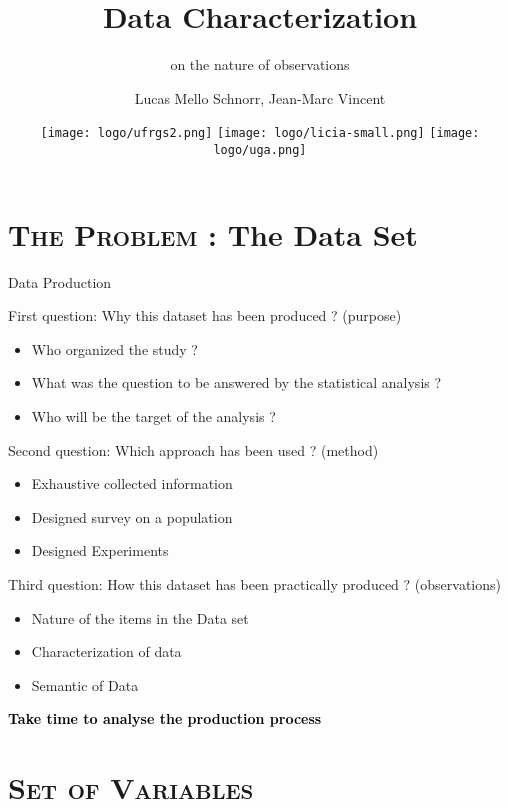 \documentclass[xcolor=x11names,compress,8pt,
handout
]{beamer}
\title[Data Characterization] %
{Data Characterization}
\subtitle{on the nature of observations}
\author%
{		
Lucas Mello Schnorr, Jean-Marc Vincent
}
\institute[LICIA] %
{%
{\large INF/UFRGS\\
Porto Alegre, Brazil – October 21th, 2017}
}
\date[Porto Alegre 2017] %
{
\texttt{[image: logo/ufrgs2.png]}\hfill
\texttt{[image: logo/licia-small.png]}\hfill
\texttt{[image: logo/uga.png]}
}
\renewcommand{\(}{\begin{columns}}
\renewcommand{\)}{\end{columns}}
\newcommand{\<}[1]{\begin{column}{#1}}
\renewcommand{\>}{\end{column}}
\begin{document}
\begin{frame}
\titlepage
\end{frame}
\section[{\scshape Data Production}]{{\scshape The Problem} : The Data Set}

\begin{frame}{Data Production}
\begin{alertblock}{First question: Why  this dataset has been produced ? (purpose) }
\begin{itemize}
\item Who organized the study ?
\item What was the question to be answered by the statistical analysis ?
\item Who will be  the target of the  analysis ?
\end{itemize}
\end{alertblock}
\pause
\begin{alertblock}{Second question: Which approach has been used  ? (method) }
\begin{itemize}
\item Exhaustive collected information  
\item Designed survey on a population  
\item Designed Experiments
\end{itemize}
\end{alertblock}
\pause
\begin{alertblock}{Third question: How this dataset has been practically produced ? (observations) }
\begin{itemize}
\item Nature of the items in the Data set  
\item Characterization of data  
\item Semantic of Data
\end{itemize}
\end{alertblock}
\centerline{\colorbox{yellow!85}{\textcolor{black}{\textbf{\large Take time to analyse the production process}}}}
\end{frame}

\section[{\scshape Set of Variables}]{{\scshape Set of Variables} }
\end{document}
